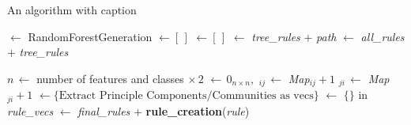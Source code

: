 \documentclass[11pt]{article}
\begin{document}
\begin{algorithm}
\caption{An algorithm with caption}\label{alg:cap}
\begin{algorithmic}
 $\gets$ RandomForestGeneration		
 $\gets [\, ]$
	  $\gets [\,]$
		 $\gets$ {\sl tree\_rules} $+$ {\sl path} 
	\EndFor
	 $\gets$ {\sl all\_rules} + {\sl tree\_rules}
\EndFor

\State

\State $n \, \gets$ number of features and classes $\times \, 2$ 
 $\gets \, 0_{n \times n}, $
		$_{ij} \, \gets$  {\sl Map}$_{ij} + 1$
		$_{ji} \, \gets$  {\sl Map}$_{ji} + 1$
	\EndIf
\EndFor
\State {}
\State 
{} $\gets\{\text{Extract Principle Components/Communities as vecs}\}$
 $\gets$ $\{\}$
 in {\sl rule\_vecs}
	 $\gets$ {\sl final\_rules} $+$ \textbf{rule\_creation}({\sl  rule})
\EndFor
\State {}
\end{algorithmic}
\end{algorithm}
\end{document}
